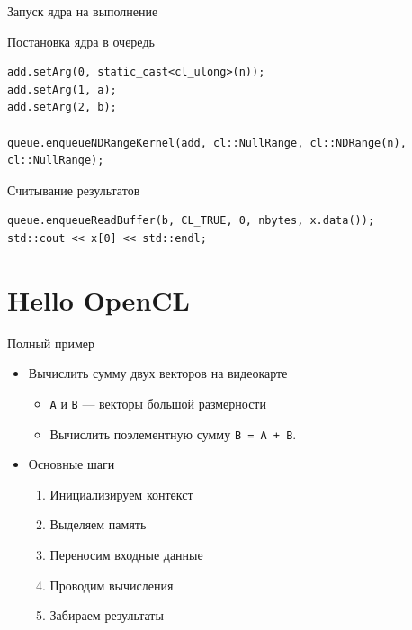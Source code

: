 \documentclass[@BEAMER_OPTIONS@]{beamer}
\newcommand{\code}[1]{\lstinline|#1|}
\begin{document}
\begin{frame}[fragile]{Запуск ядра на выполнение}
    \begin{exampleblock}{Постановка ядра в очередь}
        \begin{lstlisting}
add.setArg(0, static_cast<cl_ulong>(n));
add.setArg(1, a);
add.setArg(2, b);

queue.enqueueNDRangeKernel(add, cl::NullRange, cl::NDRange(n), cl::NullRange);
        \end{lstlisting}
    \end{exampleblock}

    \begin{exampleblock}{Считывание результатов}
        \begin{lstlisting}
queue.enqueueReadBuffer(b, CL_TRUE, 0, nbytes, x.data());
std::cout << x[0] << std::endl;
        \end{lstlisting}
    \end{exampleblock}
\end{frame}

\section{Hello OpenCL}
\begin{frame}{Полный пример}
    \begin{itemize}
        \item Вычислить сумму двух векторов на видеокарте
            \begin{itemize}
                \item \code{A} и \code{B} --- векторы большой размерности
                \item Вычислить поэлементную сумму \code{B = A + B}.
            \end{itemize}
            \vspace{\baselineskip}
        \item Основные шаги
            \begin{enumerate}
                \item Инициализируем контекст
                \item Выделяем память
                \item Переносим входные данные
                \item Проводим вычисления
                \item Забираем результаты
            \end{enumerate}
    \end{itemize}
\end{frame}
\end{document}
